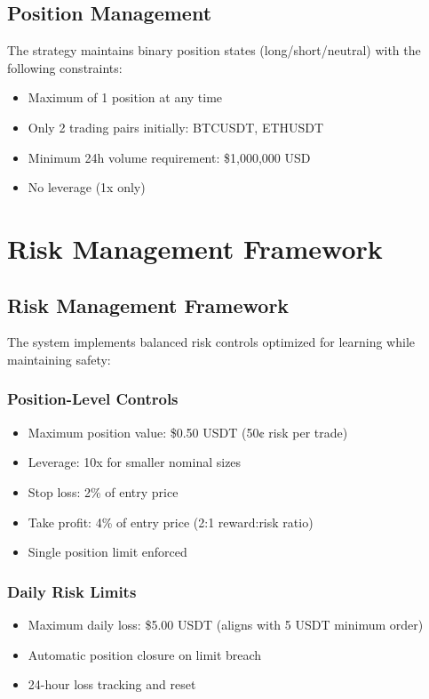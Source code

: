 \documentclass[12pt,a4paper]{article}
\begin{document}
\subsection{Position Management}
The strategy maintains binary position states (long/short/neutral) with the following constraints:

\begin{itemize}
\item Maximum of 1 position at any time
\item Only 2 trading pairs initially: BTCUSDT, ETHUSDT
\item Minimum 24h volume requirement: \$1,000,000 USD
\item No leverage (1x only)
\end{itemize}

\section{Risk Management Framework}

\subsection{Risk Management Framework}
The system implements balanced risk controls optimized for learning while maintaining safety:

\subsubsection{Position-Level Controls}
\begin{itemize}
\item Maximum position value: \$0.50 USDT (50¢ risk per trade)
\item Leverage: 10x for smaller nominal sizes
\item Stop loss: 2\% of entry price
\item Take profit: 4\% of entry price (2:1 reward:risk ratio)
\item Single position limit enforced
\end{itemize}

\subsubsection{Daily Risk Limits}
\begin{itemize}
\item Maximum daily loss: \$5.00 USDT (aligns with 5 USDT minimum order)
\item Automatic position closure on limit breach
\item 24-hour loss tracking and reset
\end{itemize}
\end{document}
